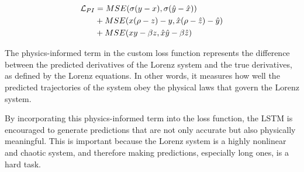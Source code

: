 \begin{align}
    \mathcal{L}_{PI} &=    MSE(\sigma (y-x), \sigma (\hat{y}-\hat{x})) \notag \\
    & + MSE(x(\rho -z) - y , \hat{x}(\rho -\hat{z}) - \hat{y}) \notag \\
    & +MSE(xy- \beta z , \hat{x}\hat{y}- \beta \hat{z})
\end{align}

The physics-informed term in the custom loss function represents the difference between the predicted derivatives of the Lorenz system and the true derivatives, as defined by the Lorenz equations. In other words, it measures how well the predicted trajectories of the system obey the physical laws that govern the Lorenz system.

By incorporating this physics-informed term into the loss function, the LSTM is encouraged to generate predictions that are not only accurate but also physically meaningful. This is important because the Lorenz system is a highly nonlinear and chaotic system, and therefore making predictions, especially long ones, is a hard task.